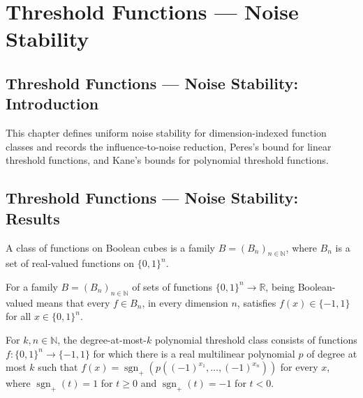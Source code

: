 \section{Threshold Functions --- Noise Stability}
\subsection*{Threshold Functions --- Noise Stability: Introduction}
This chapter defines uniform noise stability for dimension-indexed function classes and records the influence-to-noise reduction, Peres's bound for linear threshold functions, and Kane's bounds for polynomial threshold functions.

\subsection*{Threshold Functions --- Noise Stability: Results}
\begin{definition}
\leanok
{}
A class of functions on Boolean cubes is a family $B=(B_n)_{n\in\mathbb N}$, where $B_n$ is a set of real-valued functions on $\{0,1\}^{n}$.
\end{definition}

\begin{definition}
\leanok
{}
For a family $B=(B_n)_{n\in\mathbb N}$ of sets of functions $\{0,1\}^{n}\to\mathbb R$, being Boolean-valued means that every $f\in B_n$, in every dimension $n$, satisfies $f(x)\in\{-1,1\}$ for all $x\in\{0,1\}^{n}$.
\end{definition}

\begin{definition}
\leanok
{}
For $k,n\in\mathbb N$, the degree-at-most-$k$ polynomial threshold class consists of functions $f:\{0,1\}^{n}\to\{-1,1\}$ for which there is a real multilinear polynomial $p$ of degree at most $k$ such that $f(x)=\operatorname{sgn}_{+}(p((-1)^{x_1},\ldots,(-1)^{x_n}))$ for every $x$, where $\operatorname{sgn}_{+}(t)=1$ for $t\geq0$ and $\operatorname{sgn}_{+}(t)=-1$ for $t<0$.
\end{definition}

